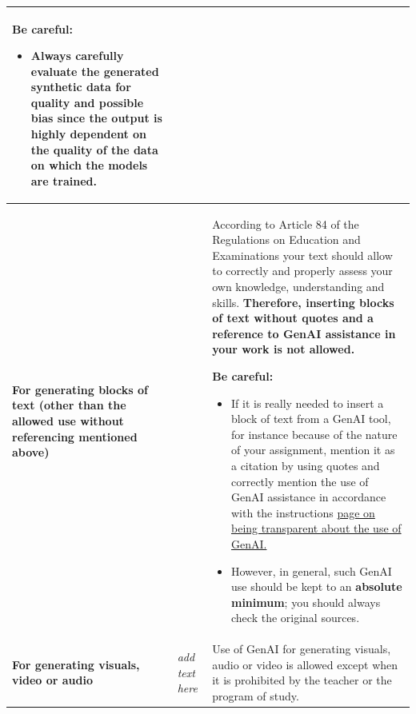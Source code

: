 \begin{longtable}{|p{}|p{}|p{}|}
\medskip
\textbf{Be careful:}
\begin{itemize}
    \item Always \textbf{carefully evaluate} the generated synthetic data for quality and possible bias since the output is highly dependent on the quality of the data on which the models are trained.
\end{itemize} \\ \hline
\textbf{For generating blocks of text
(other than the allowed use without referencing mentioned above)
} &  & According to Article 84 of the Regulations on Education and Examinations your text should allow to correctly and properly assess your own knowledge, understanding and skills. \textbf{Therefore, inserting blocks of text without quotes and a reference to GenAI assistance in your work is not allowed. }

\medskip
\textbf{Be careful:}
\begin{itemize}
    \item If it is really needed to insert a block of text from a GenAI tool, for instance because of the nature of your assignment, mention it as a citation by using quotes and correctly mention the use of GenAI assistance in accordance with the instructions \href{https://www.kuleuven.be/english/education/student/educational-tools/generative-artificial-intelligence#Transparency}{page on being transparent about the use of GenAI.}
    \item However, in general, such GenAI use should be kept to an \textbf{absolute minimum}; you should always check the original sources.
\end{itemize} \\ \hline
\textbf{For generating visuals, video or audio} & \textit{add text here} & Use of GenAI for generating visuals, audio or video is allowed except when it is prohibited by the teacher or the program of study. 


\end{longtable}
